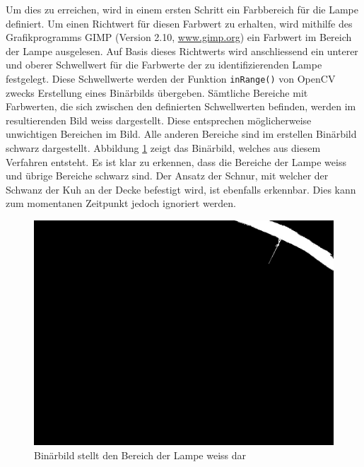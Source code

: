 Um dies zu erreichen, wird in einem ersten Schritt ein Farbbereich für die Lampe definiert. Um einen Richtwert für diesen Farbwert zu erhalten, wird mithilfe des Grafikprogramms GIMP (Version 2.10, \url{www.gimp.org}) ein Farbwert im Bereich der Lampe ausgelesen. Auf Basis dieses Richtwerts wird anschliessend ein unterer und oberer Schwellwert für die Farbwerte der zu identifizierenden Lampe festgelegt. Diese Schwellwerte werden der Funktion \texttt{inRange()} von OpenCV zwecks Erstellung eines Binärbilds übergeben. Sämtliche Bereiche mit Farbwerten, die sich zwischen den definierten Schwellwerten befinden, werden im resultierenden Bild weiss dargestellt. Diese entsprechen möglicherweise unwichtigen Bereichen im Bild. Alle anderen Bereiche sind im erstellen Binärbild schwarz dargestellt. Abbildung \ref{fig: Binärbild stellt den Bereich der Lampe weiss dar} zeigt das Binärbild, welches aus diesem Verfahren entsteht. Es ist klar zu erkennen, dass die Bereiche der Lampe weiss und übrige Bereiche schwarz sind. Der Ansatz der Schnur, mit welcher der Schwanz der Kuh an der Decke befestigt wird, ist ebenfalls erkennbar. Dies kann zum momentanen Zeitpunkt jedoch ignoriert werden.

\begin{figure}[H]
	\center
	\includegraphics[scale=0.25]{Grafiken/entwicklung/3binBildLampe.jpg}
	\caption{Binärbild stellt den Bereich der Lampe weiss dar} 
	\label{fig: Binärbild stellt den Bereich der Lampe weiss dar}
\end{figure}

